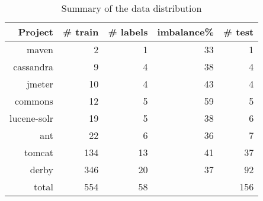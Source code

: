 
\begin{table}[!t]
\centering
    \caption{Summary of the data distribution}
    \label{tab:data}
\begin{tabular}{r|rrrr}
\toprule
Project & \# train & \# labels & imbalance\% & \# test \\
\midrule
 maven & 2 & 1 & 33 & 1 \\
 cassandra & 9 & 4 & 38 & 4 \\
 jmeter & 10 & 4 & 43 & 4 \\
 commons & 12 & 5 & 59 & 5 \\
 lucene-solr & 19 & 5 & 38 & 6 \\
 ant & 22 & 6 & 36 & 7 \\
 tomcat & 134 & 13 & 41 & 37 \\
 derby & 346 & 20 & 37 & 92 \\
 \midrule
 total & 554 & 58 & & 156 \\
 \bottomrule
\end{tabular}
\end{table}
